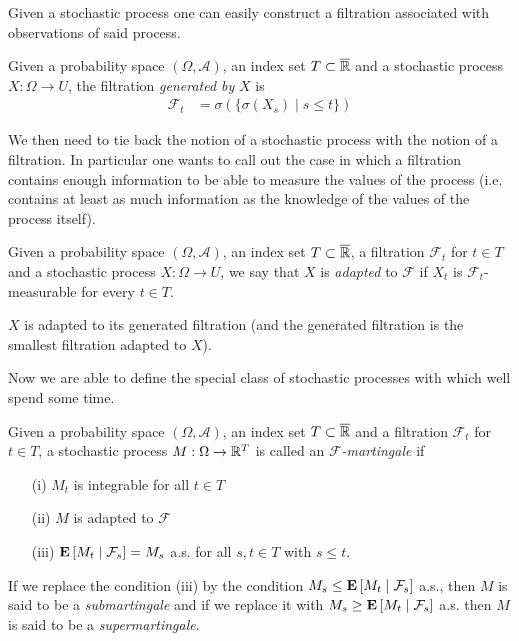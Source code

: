 Given a stochastic process one can easily construct a filtration
associated with observations of said process.
\begin{defn}Given a probability space $(\Omega,  \mathcal{A})$, an
  index set $T \subset \overline{\reals}$ and a stochastic process $X
  : \Omega \to U$, the filtration \emph{generated by} $X$ is 
\begin{align*}
\mathcal{F}_t &= \sigma(\lbrace \sigma(X_s) \mid s \leq t \rbrace)
\end{align*}
\end{defn}

We then need to tie back the notion of a stochastic process with the
notion of a filtration.  In particular one wants to call out the case
in which a filtration contains enough information to be able to
measure the values of the process (i.e. contains at least as much
information as the knowledge of the values of the process itself).
\begin{defn}Given a probability space $(\Omega,  \mathcal{A})$, an
  index set $T \subset \overline{\reals}$, a
  filtration $\mathcal{F}_t$ for $t \in T$ and a stochastic process $X
  : \Omega \to U$, we say that $X$ is \emph{adapted} to $\mathcal{F}$
  if $X_t$ is $\mathcal{F}_t$-measurable for every $t \in T$.
\end{defn}

\begin{examp}$X$ is adapted to its generated filtration (and the
  generated filtration is the smallest filtration adapted to $X$).
\end{examp}

Now we are able to define the special class of stochastic processes
with which well spend some time.
\begin{defn}Given a probability space $(\Omega,  \mathcal{A})$, an
  index set $T \subset \overline{\reals}$ and a
  filtration $\mathcal{F}_t$ for $t \in T$, a stochastic process $M :
  \Omega \to \reals^T$ is called an \emph{$\mathcal{F}$-martingale} if 
\begin{itemize}
\item[(i)]$M_t$ is integrable for all $t \in T$
\item[(ii)]$M$ is adapted to $\mathcal{F}$
\item[(iii)]$\cexpectationlong{\mathcal{F}_s}{M_t} = M_s$ a.s. for all
  $s,t \in T$ with $s \leq t$.
\end{itemize}
If we replace the condition (iii) by the condition
$M_s \leq \cexpectationlong{\mathcal{F}_s}{M_t}$ a.s., then $M$ is said to
be a \emph{submartingale} and if we replace it with
$M_s \geq \cexpectationlong{\mathcal{F}_s}{M_t} $ a.s. then $M$ is said to be a
\emph{supermartingale}.
\end{defn}

